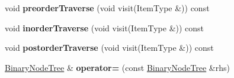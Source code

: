 \begin{DoxyCompactItemize}
\item 
\hypertarget{class_binary_node_tree_aadc0ac498739400c97d86440c6b5a721}{}\label{class_binary_node_tree_aadc0ac498739400c97d86440c6b5a721} 
void {\bfseries preorder\+Traverse} (void visit(Item\+Type \&)) const
\item 
\hypertarget{class_binary_node_tree_a910b0d440f78a109d0f158b0bd4c36f4}{}\label{class_binary_node_tree_a910b0d440f78a109d0f158b0bd4c36f4} 
void {\bfseries inorder\+Traverse} (void visit(Item\+Type \&)) const
\item 
\hypertarget{class_binary_node_tree_aee55076ce323c43e18776a724943a75f}{}\label{class_binary_node_tree_aee55076ce323c43e18776a724943a75f} 
void {\bfseries postorder\+Traverse} (void visit(Item\+Type \&)) const
\item 
\hypertarget{class_binary_node_tree_a79c6b41ab96eee8649ed29e04b9b699a}{}\label{class_binary_node_tree_a79c6b41ab96eee8649ed29e04b9b699a} 
\hyperlink{class_binary_node_tree}{Binary\+Node\+Tree} \& {\bfseries operator=} (const \hyperlink{class_binary_node_tree}{Binary\+Node\+Tree} \&rhs)
\end{DoxyCompactItemize}
